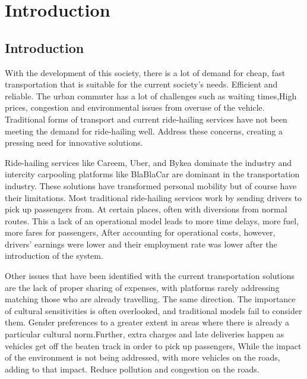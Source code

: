 
\chapter{Introduction}


\section{Introduction}

With the development of this society, there is a lot of demand for cheap, fast transportation that is suitable for the current society's needs. Efficient and reliable. The urban commuter has a lot of challenges such as waiting times,High prices, congestion and environmental issues from overuse of the vehicle. Traditional forms of transport and current ride-hailing services have not been meeting the demand for ride-hailing well. Address these concerns, creating a pressing need for innovative solutions.

Ride-hailing services like Careem, Uber, and Bykea dominate the industry and intercity carpooling platforms like BlaBlaCar are dominant in the transportation industry. These solutions have transformed personal mobility but of course have their limitations. Most traditional ride-hailing services work by sending drivers to pick up passengers from. At certain places, often with diversions from normal routes. This a lack of an operational model leads to more time delays, more fuel, more fares for passengers, After accounting for operational costs, however, drivers' earnings were lower and their employment rate was lower after the introduction of the system.

Other issues that have been identified with the current transportation solutions are the lack of proper sharing of expenses, with platforms rarely addressing matching those who are already travelling. The same direction. The importance of cultural sensitivities is often overlooked, and traditional models fail to consider them. Gender preferences to a greater extent in areas where there is already a particular cultural norm.Further, extra charges and late deliveries happen as vehicles get off the beaten track in order to pick up passengers, While the impact of the environment is not being addressed, with more vehicles on the roads, adding to that impact. Reduce pollution and congestion on the roads.

